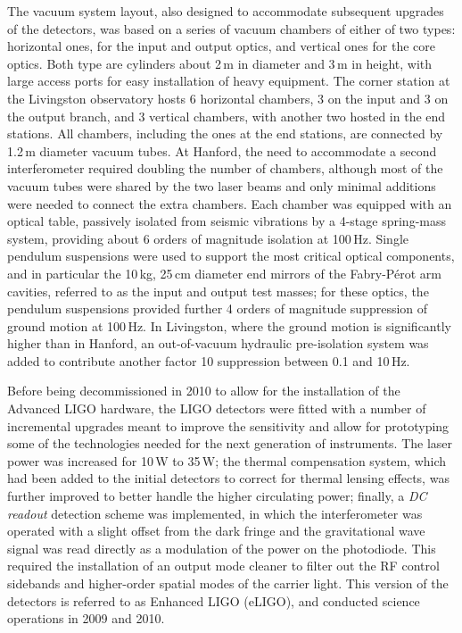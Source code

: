 The vacuum system layout, also designed to accommodate subsequent upgrades of the detectors, was based on a series of vacuum chambers of either of two types: horizontal ones, for the input and output optics, and vertical ones for the core optics.
Both type are cylinders about 2\,m in diameter and 3\,m in height, with large access ports for easy installation of heavy equipment.
The corner station at the Livingston observatory hosts 6 horizontal chambers, 3 on the input and 3  on the output branch, and 3 vertical chambers, with another two hosted in the end stations.
All chambers, including the ones at the end stations, are connected by 1.2\,m diameter vacuum tubes.
At Hanford, the need to accommodate a second interferometer required doubling the number of chambers, although most of the vacuum tubes were shared by the two laser beams and only minimal additions were needed to connect the extra chambers.
Each chamber was equipped with an optical table, passively isolated from seismic vibrations by a 4-stage spring-mass system, providing about 6 orders of magnitude isolation at 100\,Hz\cite{Giaime_1996}.
Single pendulum suspensions were used to support the most critical optical components, and in particular the 10\,kg, 25\,cm diameter end mirrors of the Fabry-P\'{e}rot arm cavities, referred to as the input and output test masses; for these optics, the pendulum suspensions provided further 4 orders of magnitude suppression of ground motion at 100\,Hz.
In Livingston, where the ground motion is significantly higher than in Hanford, an out-of-vacuum hydraulic pre-isolation system was added to contribute another factor 10 suppression between 0.1 and 10\,Hz.

Before being decommissioned in 2010 to allow for the installation of the Advanced LIGO hardware, the LIGO detectors were fitted with a number of incremental upgrades\cite{Aasi_2015} meant to improve the sensitivity and allow for prototyping some of the technologies needed for the next generation of instruments.
The laser power was increased for 10\,W to 35\,W;
the thermal compensation system, which had been added to the initial detectors to correct for thermal lensing effects, was further improved to better handle the higher circulating power;
finally, a \textit{DC readout} detection scheme was implemented, in which the interferometer was operated with a slight offset from the dark fringe and the gravitational wave signal was read directly as a modulation of the power on the photodiode.
This required the installation of an output mode cleaner to filter out the RF control sidebands and higher-order spatial modes of the carrier light.
This version of the detectors is referred to as Enhanced LIGO (eLIGO), and conducted science operations in 2009 and 2010. 

